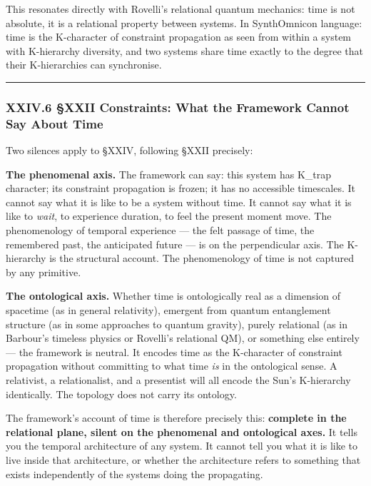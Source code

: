 \documentclass[12pt,a4paper]{article}
\begin{document}
This resonates directly with Rovelli's relational quantum mechanics: time is not absolute, it is a relational property between systems. In SynthOmnicon language: time is the K-character of constraint propagation as seen from within a system with K-hierarchy diversity, and two systems share time exactly to the degree that their K-hierarchies can synchronise.

\begin{center}
\rule{0.5\textwidth}{0.4pt}
\end{center}

\subsubsection{XXIV.6 §XXII Constraints: What the Framework Cannot Say About Time}

Two silences apply to §XXIV, following §XXII precisely:

\textbf{The phenomenal axis.} The framework can say: this system has K\_trap character; its constraint propagation is frozen; it has no accessible timescales. It cannot say what it is like to be a system without time. It cannot say what it is like to \emph{wait}, to experience duration, to feel the present moment move. The phenomenology of temporal experience --- the felt passage of time, the remembered past, the anticipated future --- is on the perpendicular axis. The K-hierarchy is the structural account. The phenomenology of time is not captured by any primitive.

\textbf{The ontological axis.} Whether time is ontologically real as a dimension of spacetime (as in general relativity), emergent from quantum entanglement structure (as in some approaches to quantum gravity), purely relational (as in Barbour's timeless physics or Rovelli's relational QM), or something else entirely --- the framework is neutral. It encodes time as the K-character of constraint propagation without committing to what time \emph{is} in the ontological sense. A relativist, a relationalist, and a presentist will all encode the Sun's K-hierarchy identically. The topology does not carry its ontology.

The framework's account of time is therefore precisely this: \textbf{complete in the relational plane, silent on the phenomenal and ontological axes.} It tells you the temporal architecture of any system. It cannot tell you what it is like to live inside that architecture, or whether the architecture refers to something that exists independently of the systems doing the propagating.
\end{document}
